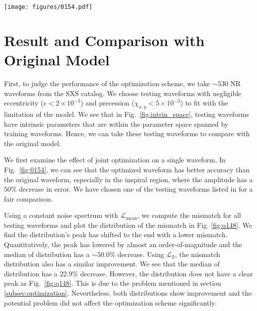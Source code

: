 \documentclass[twocolumn]{aastex631}
\begin{document}
\begin{figure*}[t]
	\centering
	\texttt{[image: figures/0154.pdf]}
	\caption{Comparison between original and optimized IMRPhenomD waveforms. Here shows the SXS:BBH:0154 NR waveform, which has mass ratio $q=1$ and $\chi_1=\chi_2=-0.8$. The original mismatch is around $2.8\times10^{-4}$ and the optimized mismatch is around $5.3\times10^{-5}$. Top: It shows the amplitude and phase of NR, original IMRPhenomD and optimized IMRPhenomD waveform. Bottom: It shows the relative error of amplitudes between NR and IMRPhenomD waveforms, and the absolute error of phases between NR and IMRPhenomD waveforms}
	\label{fig:0154}
\end{figure*}

\section{Result and Comparison with Original Model} \label{sec:result}

First, to judge the performance of the optimization scheme, we take $\sim530$ NR waveforms from the SXS catalog. We choose testing waveforms with negligible eccentricity (${e<2\times10^{-3}}$) and precession (${\chi_{x,y}<5\times10^{-3}}$) to fit with the limitation of the model. We see that in Fig.~\ref{fig:intrin_space}, testing waveforms have intrinsic parameters that are within the parameter space spanned by training waveforms. Hence, we can take these testing waveforms to compare with the original model. 

We first examine the effect of joint optimization on a single waveform. In Fig.~\ref{fig:0154}, we can see that the optimized waveform has better accuracy than the original waveform, especially in the inspiral region, where the amplitude has a $50\%$ decrease in error. We have chosen one of the testing waveforms listed in \citep{khan2016frequency} for a fair comparison. 

Using a constant noise spectrum with $\mathcal{L}_{\mathrm{mean}}$, we compute the mismatch for all testing waveforms and plot the distribution of the mismatch in Fig. \ref{fig:q148}. We find the distribution's peak has shifted to the end with a lower mismatch. Quantitatively, the peak has lowered by almost an order-of-magnitude and the median of distribution has a $\sim50.0\%$ decrease. Using $\mathcal{L}_{\mathrm{fl}}$, the mismatch distribution also has a similar improvement. We see that the median of distribution has a $22.9\%$ decrease. However, the distribution does not have a clear peak as Fig.~\ref{fig:q148}. This is due to the problem mentioned in section \ref{subsec:optimization}. Nevertheless, both distributions show improvement and the potential problem did not affect the optimization scheme significantly.  
\end{document}
